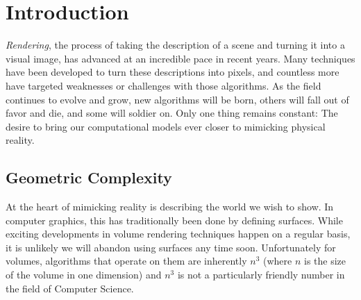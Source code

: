 \documentclass[12pt]{ucthesis}
\begin{document}
\begin{frontmatter}
\begin{abstract}
\end{abstract}





\tableofcontents


\listoftables

\listoffigures

\end{frontmatter}

\pagestyle{plain}




\renewcommand{\baselinestretch}{1.66}







\chapter{Introduction}
\label{intro}

\emph{Rendering}, the process of taking the description of a scene and turning
it into a visual image, has advanced at an incredible pace in recent
years. Many techniques have been developed to turn these descriptions into
pixels, and countless more have targeted weaknesses or challenges with those
algorithms. As the field continues to evolve and grow, new algorithms will be
born, others will fall out of favor and die, and some will soldier on. Only
one thing remains constant: The desire to bring our computational models ever
closer to mimicking physical reality.

\section{Geometric Complexity}
\label{complexity}

At the heart of mimicking reality is describing the world we wish to show. In
computer graphics, this has traditionally been done by defining surfaces. While
exciting developments in volume rendering techniques happen on a regular basis,
it is unlikely we will abandon using surfaces any time soon. Unfortunately for
volumes, algorithms that operate on them are inherently $n^3$ (where $n$ is the
size of the volume in one dimension) and $n^3$ is not a particularly friendly
number in the field of Computer Science.
\end{document}
